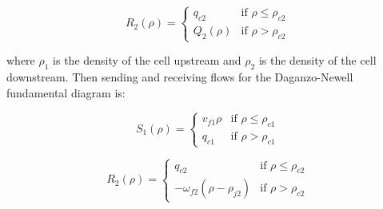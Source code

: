 \documentclass[11pt]{article}
\numberwithin{equation}{section}
\numberwithin{figure}{section}
\numberwithin{table}{section}
\begin{document}
\begin{equation} \label{eq:receivingFlow1}
R_{2}(\rho) = \begin{cases}
q_{c2} & \text{if } \rho \leq \rho_{c2} \\
Q_{2}(\rho) &  \text{if } \rho > \rho_{c2}
\end{cases}
\end{equation}

\noindent where $\rho_{1}$ is the density of the cell upstream and $\rho_{2}$ is the density of the cell downstream. Then sending and receiving flows for the Daganzo-Newell fundamental diagram is:

\begin{equation} \label{eq:sendingFlow2}
S_{1}(\rho) = \begin{cases}
v_{f1}\rho & \text{if } \rho \leq \rho_{c1} \\
q_{c1} &  \text{if } \rho > \rho_{c1}
\end{cases}
\end{equation}

\begin{equation} \label{eq:receivingFlow2}
R_{2}(\rho) = \begin{cases}
q_{c2} & \text{if } \rho \leq \rho_{c2} \\
-\omega_{f2} \left( \rho - \rho_{j2} \right) & \text{if } \rho > \rho_{c2}
\end{cases}
\end{equation}
\end{document}

